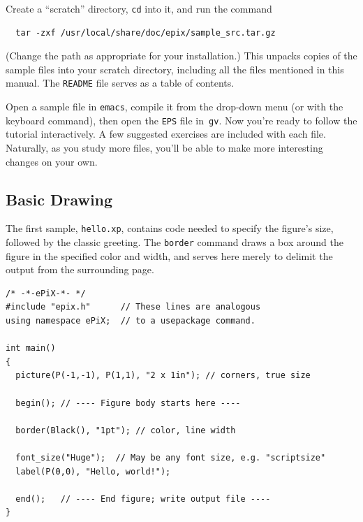 \documentclass[12pt,letterpaper]{book}
\newcommand{\code}[1]{\texttt{#1}}
\newcommand{\filename}[1]{\texttt{#1}}
\begin{document}
Create a ``scratch'' directory, \code{cd} into it, and run the command
\begin{verbatim}
  tar -zxf /usr/local/share/doc/epix/sample_src.tar.gz
\end{verbatim}
(Change the path as appropriate for your installation.)  This unpacks
copies of the sample files into your scratch directory, including all
the files mentioned in this manual. The \filename{README} file serves
as a table of contents.

Open a sample file in \filename{emacs}, compile it from the drop-down
menu (or with the keyboard command), then open the \filename{EPS} file
in~\filename{gv}. Now you're ready to follow the tutorial
interactively. A few suggested exercises are included with each
file. Naturally, as you study more files, you'll be able to make more
interesting changes on your own.


\subsection*{Basic Drawing}

The first sample, \filename{hello.xp}, contains code needed to specify
the figure's size, followed by the classic greeting. The \code{border}
command draws a box around the figure in the specified color and
width, and serves here merely to delimit the output from the
surrounding page.
\begin{verbatim}
/* -*-ePiX-*- */
#include "epix.h"      // These lines are analogous
using namespace ePiX;  // to a usepackage command.

int main()
{
  picture(P(-1,-1), P(1,1), "2 x 1in"); // corners, true size

  begin(); // ---- Figure body starts here ----

  border(Black(), "1pt"); // color, line width

  font_size("Huge");  // May be any font size, e.g. "scriptsize"
  label(P(0,0), "Hello, world!");

  end();   // ---- End figure; write output file ----
}
\end{verbatim}

\begin{center}
  
\end{center}
\end{document}
